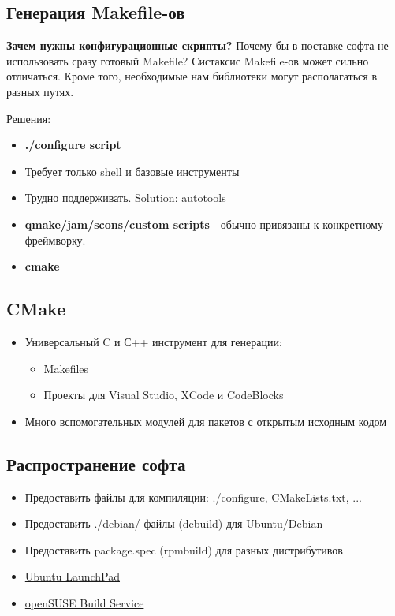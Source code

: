 \subsection{Генерация Makefile-ов}

\textbf{Зачем нужны конфигурационные скрипты?} Почему бы в поставке софта не использовать сразу готовый Makefile? Систаксис Makefile-ов может сильно отличаться. Кроме того, необходимые нам библиотеки могут располагаться в разных путях.

Решения:
\begin{itemize}
	\item \textbf{./configure script} 
		\item Требует только shell и базовые инструменты
		\item Трудно поддерживать. Solution: autotools
	\item \textbf{qmake/jam/scons/custom scripts} - обычно привязаны к конкретному фреймворку.
	\item \textbf{cmake}
\end{itemize}

\subsection{CMake}

\begin{itemize}
	\item Универсальный C и С++ инструмент для генерации:
		\begin{itemize}
			\item Makefiles
			\item Проекты для Visual Studio, XCode и CodeBlocks
		\end{itemize}
	\item Много вспомогательных модулей для пакетов с открытым исходным кодом
\end{itemize}

\subsection{Распространение софта}

\begin{itemize}
	\item Предоставить файлы для компиляции: ./configure, CMakeLists.txt, ...
	\item Предоставить ./debian/ файлы (debuild) для Ubuntu/Debian
	\item Предоставить package.spec (rpmbuild) для разных дистрибутивов
	\item \href{https://launchpad.net}{Ubuntu LaunchPad}
	\item \href{https://build.opensuse.org}{openSUSE Build Service}
\end{itemize}

